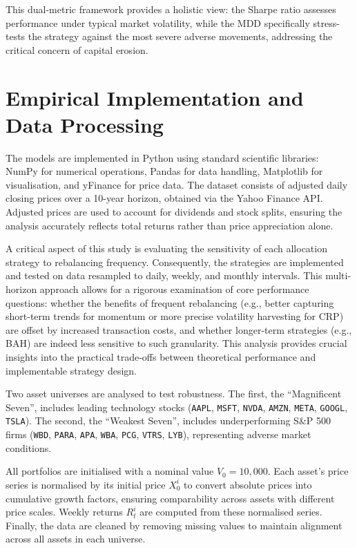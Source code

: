 \documentclass[12pt,a4paper]{report}
\begin{document}
This dual-metric framework provides a holistic view: the Sharpe ratio assesses performance under typical market volatility, while the MDD specifically stress-tests the strategy against the most severe adverse movements, addressing the critical concern of capital erosion.

\section{Empirical Implementation and Data Processing}
\label{sec:implementation}

The models are implemented in Python using standard scientific libraries: NumPy for numerical operations, Pandas for data handling, Matplotlib for visualisation, and yFinance for price data. The dataset consists of adjusted daily closing prices over a 10-year horizon, obtained via the Yahoo Finance API. Adjusted prices are used to account for dividends and stock splits, ensuring the analysis accurately reflects total returns rather than price appreciation alone.

A critical aspect of this study is evaluating the sensitivity of each allocation strategy to rebalancing frequency. Consequently, the strategies are implemented and tested on data resampled to daily, weekly, and monthly intervals. This multi-horizon approach allows for a rigorous examination of core performance questions: whether the benefits of frequent rebalancing (e.g., better capturing short-term trends for momentum or more precise volatility harvesting for CRP) are offset by increased transaction costs, and whether longer-term strategies (e.g., BAH) are indeed less sensitive to such granularity. This analysis provides crucial insights into the practical trade-offs between theoretical performance and implementable strategy design.

Two asset universes are analysed to test robustness. 
The first, the ``Magnificent Seven'', includes leading technology stocks 
(\texttt{AAPL}, \texttt{MSFT}, \texttt{NVDA}, \texttt{AMZN}, \texttt{META}, \texttt{GOOGL}, \texttt{TSLA}). 
The second, the ``Weakest Seven'', includes underperforming S\&P 500 firms 
(\texttt{WBD}, \texttt{PARA}, \texttt{APA}, \texttt{WBA}, \texttt{PCG}, \texttt{VTRS}, \texttt{LYB}), 
representing adverse market conditions.

All portfolios are initialised with a nominal value \( V_0 = 10,000 \). Each asset's price series is normalised by its initial price \( X^i_0 \) to convert absolute prices into cumulative growth factors, ensuring comparability across assets with different price scales. Weekly returns \( R^i_t \) are computed from these normalised series. Finally, the data are cleaned by removing missing values to maintain alignment across all assets in each universe.
\end{document}
